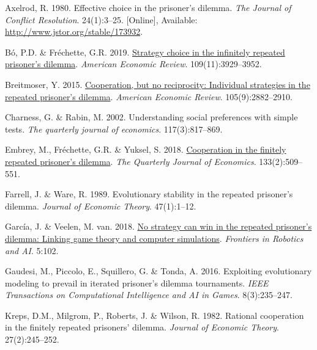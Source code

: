 \documentclass[11pt,preprint]{elsarticle}
\numberwithin{equation}{section}
\numberwithin{figure}{section}
\numberwithin{table}{section}
\newlength{\cslhangindent}
\newenvironment{CSLReferences}[2] %
{\begin{list}{}{%
	\setlength{\itemindent}{0pt}
	\setlength{\leftmargin}{0pt}
	\setlength{\parsep}{0pt}
	\ifodd #1
	\setlength{\leftmargin}{\cslhangindent}
	\setlength{\itemindent}{-1\cslhangindent}
	\fi
	\setlength{\itemsep}{#2\baselineskip}}}
{\end{list}}
\begin{document}
\hypertarget{refs}{}
\begin{CSLReferences}{1}{0}
\leavevmode{}%
Axelrod, R. 1980. Effective choice in the prisoner's dilemma. \emph{The
Journal of Conflict Resolution}. 24(1):3--25. {[}Online{]}, Available:
\url{http://www.jstor.org/stable/173932}.

\leavevmode{}%
Bó, P.D. \& Fréchette, G.R. 2019.
\href{https://doi.org/10.1257/aer.20181480}{Strategy choice in the
infinitely repeated prisoner's dilemma}. \emph{American Economic
Review}. 109(11):3929--3952.

\leavevmode{}%
Breitmoser, Y. 2015.
\href{https://doi.org/10.1257/aer.20130675}{Cooperation, but no
reciprocity: Individual strategies in the repeated prisoner's dilemma}.
\emph{American Economic Review}. 105(9):2882--2910.

\leavevmode{}%
Charness, G. \& Rabin, M. 2002. Understanding social preferences with
simple tests. \emph{The quarterly journal of economics}.
117(3):817--869.

\leavevmode{}%
Embrey, M., Fréchette, G.R. \& Yuksel, S. 2018.
\href{https://doi.org/10.1093/qje/qjx033}{Cooperation in the finitely
repeated prisoner's dilemma}. \emph{The Quarterly Journal of Economics}.
133(2):509--551.

\leavevmode{}%
Farrell, J. \& Ware, R. 1989. Evolutionary stability in the repeated
prisoner's dilemma. \emph{Journal of Economic Theory}. 47(1):1--12.

\leavevmode{}%
García, J. \& Veelen, M. van. 2018.
\href{https://doi.org/10.3389/frobt.2018.00102}{No strategy can win in
the repeated prisoner's dilemma: Linking game theory and computer
simulations}. \emph{Frontiers in Robotics and AI}. 5:102.

\leavevmode{}%
Gaudesi, M., Piccolo, E., Squillero, G. \& Tonda, A. 2016. Exploiting
evolutionary modeling to prevail in iterated prisoner's dilemma
tournaments. \emph{IEEE Transactions on Computational Intelligence and
AI in Games}. 8(3):235--247.

\leavevmode{}%
Kreps, D.M., Milgrom, P., Roberts, J. \& Wilson, R. 1982. Rational
cooperation in the finitely repeated prisoners' dilemma. \emph{Journal
of Economic Theory}. 27(2):245--252.


\end{CSLReferences}
\end{document}
